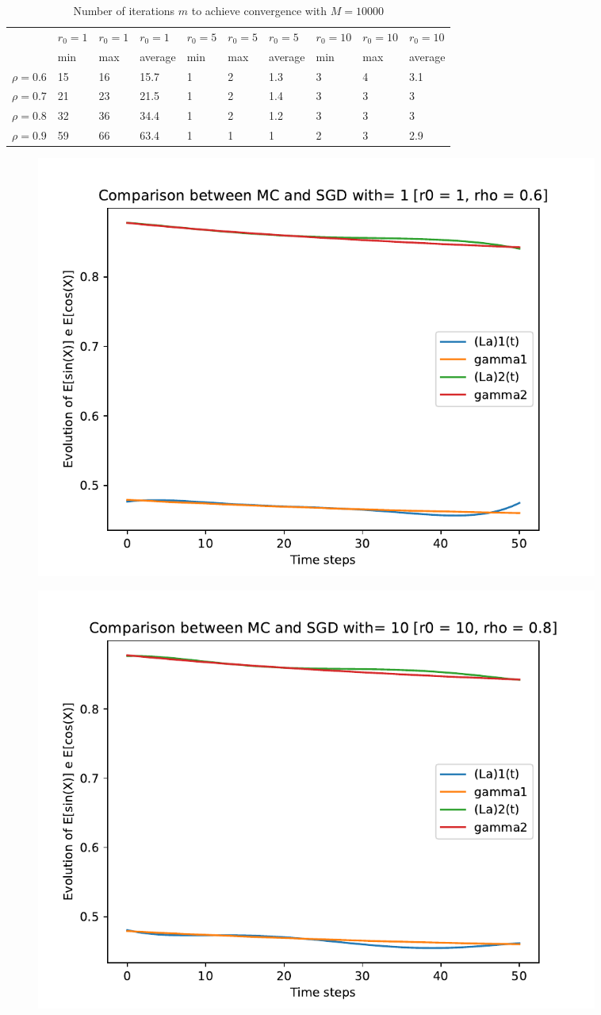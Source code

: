 \documentclass[a4paper,11pt,openright]{report}
\begin{document}
\begin{table}[H]
\centering
\addtolength{\leftskip}{-1.5cm}
\addtolength{\rightskip}{-1.5cm}
\begin{tabular}{|c|lllllllll|}
\hline
$ $ & $r_0 = 1$ & $r_0 = 1$ & $r_0 = 1$ & $r_0 = 5$ & $r_0 = 5$ & $r_0 = 5$ & $r_0 = 10$ & $r_0 = 10$ & $r_0 = 10$  \\
$ $ & min & max & average & min & max & average & min & max & average \\ 
\hline
$\rho = 0.6$ & 15 & 16 & 15.7 & 1 & 2 & 1.3 & 3 & 4 & 3.1\\

$\rho = 0.7$ & 21 & 23 & 21.5 & 1 & 2 & 1.4 & 3 & 3 & 3\\

$\rho = 0.8$ & 32 & 36 & 34.4 & 1 & 2 & 1.2 & 3 & 3 & 3\\

$\rho = 0.9$ & 59 & 66 & 63.4 & 1 & 1 & 1 & 2 & 3 & 2.9\\
\hline
\end{tabular}
\caption{Number of iterations $m$ to achieve convergence with $M = 10000$}
\end{table}
\begin{figure}[H]
\centering
\includegraphics[width=0.9\textwidth]{images/graphics T = 0.5/n = 5, M = 1 sine and cosine.pdf}
\end{figure}
\begin{figure}[H]
\centering
\includegraphics[width=0.9\textwidth]{images/graphics T = 0.5/n = 5, M = 10 sine and cosine.pdf}
\end{figure}
\end{document}
